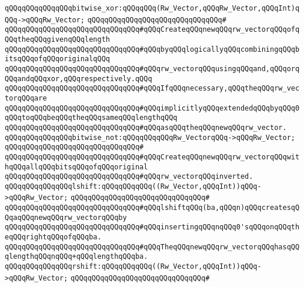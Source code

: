 \verb|qQQqqQQqqQQqqQQqbitwise_xor:qQQqqQQq(Rw_Vector,qQQqRw_Vector,qQQqInt)qQQq->qQQqRw_Vector;|\newline
\verb|qQQqqQQqqQQqqQQqqQQqqQQqqQQqqQQq#|\newline
\verb|qQQqqQQqqQQqqQQqqQQqqQQqqQQqqQQq#qQQqCreateqQQqnewqQQqrw_vectorqQQqofqQQqtheqQQqgivenqQQqlength|\newline
\verb|qQQqqQQqqQQqqQQqqQQqqQQqqQQqqQQq#qQQqbyqQQqlogicallyqQQqcombiningqQQqbitsqQQqofqQQqoriginalqQQq|\newline
\verb|qQQqqQQqqQQqqQQqqQQqqQQqqQQqqQQq#qQQqrw_vectorqQQqusingqQQqand,qQQqorqQQqandqQQqxor,qQQqrespectively.qQQq|\newline
\verb|qQQqqQQqqQQqqQQqqQQqqQQqqQQqqQQq#qQQqIfqQQqnecessary,qQQqtheqQQqrw_vectorqQQqare|\newline
\verb|qQQqqQQqqQQqqQQqqQQqqQQqqQQqqQQq#qQQqimplicitlyqQQqextendedqQQqbyqQQq0qQQqtoqQQqbeqQQqtheqQQqsameqQQqlengthqQQq|\newline
\verb|qQQqqQQqqQQqqQQqqQQqqQQqqQQqqQQq#qQQqasqQQqtheqQQqnewqQQqrw_vector.|\newline
\newline
\verb|qQQqqQQqqQQqqQQqbitwise_not:qQQqqQQqqQQqRw_VectorqQQq->qQQqRw_Vector;|\newline
\verb|qQQqqQQqqQQqqQQqqQQqqQQqqQQqqQQq#|\newline
\verb|qQQqqQQqqQQqqQQqqQQqqQQqqQQqqQQq#qQQqCreateqQQqnewqQQqrw_vectorqQQqwithqQQqallqQQqbitsqQQqofqQQqoriginal|\newline
\verb|qQQqqQQqqQQqqQQqqQQqqQQqqQQqqQQq#qQQqrw_vectorqQQqinverted.|\newline
\newline
\verb|qQQqqQQqqQQqqQQqlshift:qQQqqQQqqQQq((Rw_Vector,qQQqInt))qQQq->qQQqRw_Vector;|\newline
\verb|qQQqqQQqqQQqqQQqqQQqqQQqqQQqqQQq#|\newline
\verb|qQQqqQQqqQQqqQQqqQQqqQQqqQQqqQQq#qQQqlshiftqQQq(ba,qQQqn)qQQqcreatesqQQqaqQQqnewqQQqrw_vectorqQQqby|\newline
\verb|qQQqqQQqqQQqqQQqqQQqqQQqqQQqqQQq#qQQqinsertingqQQqnqQQq0'sqQQqonqQQqtheqQQqrightqQQqofqQQqba.|\newline
\verb|qQQqqQQqqQQqqQQqqQQqqQQqqQQqqQQq#qQQqTheqQQqnewqQQqrw_vectorqQQqhasqQQqlengthqQQqnqQQq+qQQqlengthqQQqba.|\newline
\newline
\verb|qQQqqQQqqQQqqQQqrshift:qQQqqQQqqQQq((Rw_Vector,qQQqInt))qQQq->qQQqRw_Vector;|\newline
\verb|qQQqqQQqqQQqqQQqqQQqqQQqqQQqqQQq#|\newline
